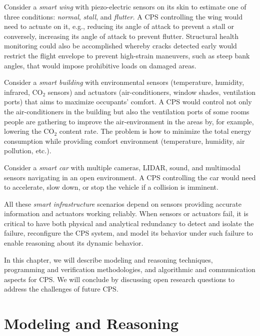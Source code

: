 \documentclass[
graybox,
envcountchap
]{svmult}
\begin{document}
\begin{bibunit}

Consider a {\it smart wing} with piezo-electric sensors on its skin to estimate one of three conditions:  {\it normal}, {\it stall}, and {\it flutter.}  A CPS controlling the wing would need to actuate on it, e.g., reducing its angle of attack to prevent a stall or conversely, increasing its angle of attack to prevent flutter.  Structural health monitoring could also be accomplished whereby cracks detected early would restrict the flight envelope to prevent high-strain maneuvers, such as steep bank angles, that would impose prohibitive loads on damaged areas.

Consider a \textit{smart building} with environmental sensors (temperature, humidity, infrared, CO$_2$ sensors) and actuators (air-conditioners, window shades, ventilation ports) that aims to maximize occupants' comfort. A CPS would control not only the air-conditioners in the building but also the ventilation ports of some rooms people are gathering to improve the air-environment in the areas by, for example,  lowering the CO$_2$ content rate. The problem is how to minimize the total energy consumption while providing comfort environment (temperature, humidity, air pollution, etc.).

Consider a {\it smart car} with multiple cameras, LIDAR, sound, and multimodal sensors navigating in an open environment.  A CPS controlling the car would need to accelerate, slow down, or stop the vehicle if a collision is imminent.

All these {\it smart infrastructure} scenarios depend on sensors providing accurate information and actuators working reliably.  When sensors or actuators fail, it is critical to have both physical and analytical redundancy to detect and isolate the failure, reconfigure the CPS system, and model its behavior under such failure to enable reasoning about its dynamic behavior.

In this chapter, we will describe modeling and reasoning techniques, programming and verification methodologies, and algorithmic and communication aspects for CPS.  We will conclude by discussing open research questions to address the challenges of future CPS.

\section{Modeling and Reasoning} %


\end{bibunit}
\end{document}
